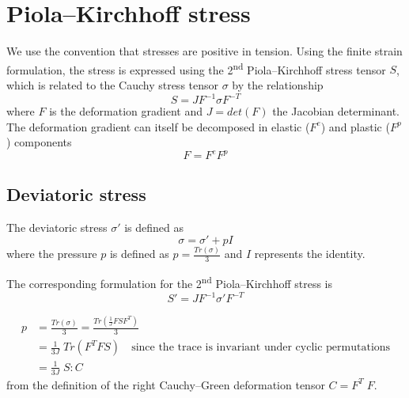 \documentclass[]{scrreprt}
\begin{document}
\section{Piola--Kirchhoff stress}

We use the convention that stresses are positive in tension. Using the finite strain formulation, the stress is expressed using the 2\textsuperscript{nd} Piola--Kirchhoff stress tensor $S$, which is related to the Cauchy stress tensor $\sigma$ by the relationship
\begin{equation}
	S = J F^{-1} \sigma F^{-T}
\end{equation}
where $F$ is the deformation gradient and $J=det(F)$ the Jacobian determinant. The deformation gradient can itself be decomposed in elastic ($F^e$) and plastic ($F^p$) components \citep{Belytschko2014}
\begin{equation}
	F = F^e F^p
\end{equation}

\subsection{Deviatoric stress}
The deviatoric stress $\sigma'$ is defined as
\begin{equation}
  \label{eq:deviatoric_stress}
	\sigma = \sigma' + p I
\end{equation}
where the pressure $p$ is defined as $p=\frac{Tr(\sigma)}{3}$ and $I$ represents the identity.


The corresponding formulation for the 2\textsuperscript{nd} Piola--Kirchhoff stress is
\begin{equation}
  \label{eq:def_dev_pk2}
	S' = J F^{-1} \sigma' F^{-T}
\end{equation}

\begin{align} \label{eq:p_pk2}
	  p  & =  \frac{Tr(\sigma)}{3} =  \frac{Tr\left(\frac{1}{J} F S F^{T} \right)}{3} \nonumber \\	
	     & = \frac{1}{3J}\;Tr\left( F^T F S \right) \quad \text{since the trace is invariant under cyclic permutations} \nonumber \\
	     & = \frac{1}{3J}\;S:C
\end{align}
from the definition of the right Cauchy--Green deformation tensor $C=F^T\;F$.
\end{document}
